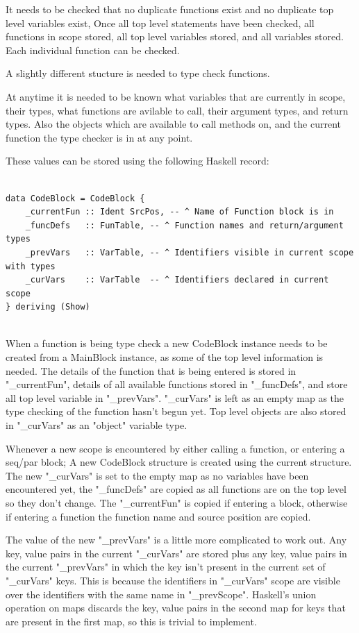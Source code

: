It needs to be checked that no duplicate functions exist and  no duplicate top level variables exist,
Once all top level statements have been checked, all functions in scope stored, 
all top level variables stored, and all variables stored. Each individual function
can be checked.

A slightly different stucture is needed to type check functions.

At anytime it is needed to be known what variables that are currently in scope, their types,
what functions are avilable to call, their argument types, and return types. Also the
objects which are available to call methods on, and the current function the type checker
is in at any point.

These values can be stored using the following Haskell record: 

\begin{lstlisting}[style=myHaskell]

data CodeBlock = CodeBlock {
    _currentFun :: Ident SrcPos, -- ^ Name of Function block is in
    _funcDefs   :: FunTable, -- ^ Function names and return/argument types
    _prevVars   :: VarTable, -- ^ Identifiers visible in current scope with types
    _curVars    :: VarTable  -- ^ Identifiers declared in current scope
} deriving (Show)


\end{lstlisting}

When a function is being type check a new CodeBlock instance needs to be
created from a MainBlock instance, as some of the top level information is needed.
The details of the function that is being entered is stored in "\_currentFun", 
details of all available functions stored in "\_funcDefs", and store all
top level variable in "\_prevVars". "\_curVars" is left as an empty map as the
type checking of the function hasn't begun yet. Top level objects are also
stored in "\_curVars" as an "object" variable type.

Whenever a new scope is encountered by either calling a function, or entering a seq/par block;
A new CodeBlock structure is created using the current structure. The new "\_curVars"
is set to the empty map as no variables have been encountered yet, the "\_funcDefs"
are copied as all functions are on the top level so they don't change. The "\_currentFun"
is copied if entering a block, otherwise if entering a function the function name
and source position are copied. 

The value of the new "\_prevVars" is a little more complicated to work out.
Any key, value pairs in the current "\_curVars" are stored plus any key, value pairs in the current "\_prevVars" in which the key isn't present in the current 
set of "\_curVars" keys. This is because
the identifiers in "\_curVars" scope are visible over the identifiers with
the same name in "\_prevScope". Haskell's union operation on maps
discards the key, value pairs in the second map for keys that are
present in the first map, so this is trivial to implement.

